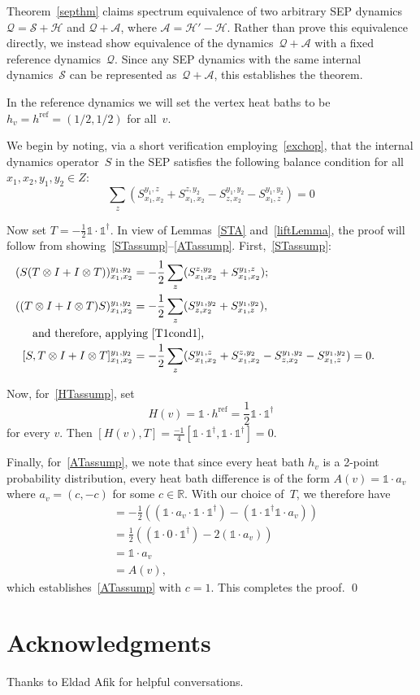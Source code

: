 \documentclass[11pt]{article}
\theoremstyle{plain}
\theoremstyle{definition}
\theoremstyle{remark}
\newcommand{\rset}{\mathbb R}
\numberwithin{equation}{section}
\newcommand{\cA}{{\mathcal A}}
\newcommand{\cH}{{\mathcal H}}
\newcommand{\cS}{{\mathcal S}}
\newcommand{\be}{\begin{equation}}
\newcommand{\ee}{\end{equation}}
\newcommand{\da}{\dagger}
\newcommand{\one}{\mathbb{1}}
\renewcommand{\cS}{{\mathcal Q}}
\newcommand{\cSin}{{\mathcal S}}
\newcommand{\hrf}{h^{\text{ref}}}
\newenvironment{proofof}[1]{{\par\bigskip\noindent \em Proof of #1.}\/}{\hfill\qed\bigskip}
\begin{document}
\begin{proofof}{Theorem~\ref{septhm}}
Theorem~\ref{septhm} claims spectrum equivalence of two arbitrary SEP dynamics
$\cS=\cSin+\cH$ and $\cS+\cA$, where $\cA=\cH'-\cH$.  Rather than prove this equivalence
directly, we instead show equivalence of the dynamics~$\cS+\cA$ with a fixed reference
dynamics~$\cS$.  Since any SEP dynamics with the same internal dynamics~$\cSin$ can be 
represented as~$\cS+\cA$, this establishes the theorem.

In the reference dynamics we will set the vertex heat baths to be $h_v=\hrf=(1/2,1/2)$ for all~$v$.

We begin by noting, via a short verification employing~\eqref{exchop}, that the
internal dynamics operator~$S$ in the SEP
satisfies the following balance condition for all $x_1,x_2,y_1,y_2\in Z$:
\be
\sum_{z} (S_{x_1,x_2}^{y_1,z}+S_{x_1,x_2}^{z,y_2}
-S_{z,x_2}^{y_1,y_2} - S_{x_1,z}^{y_1,y_2})  = 0
\label{T1cond1}
\ee

Now set $T=-\frac{1}{2}\one \cdot \one^\da$. 
In view of Lemmas~\ref{STA} and~\ref{liftLemma}, the proof will follow from showing~\eqref{STassump}--\eqref{ATassump}. 
First,~\eqref{STassump}:
\begin{align*} 
(S(T\otimes I + I \otimes T))_{x_1,x_2}^{y_1,y_2}
&=-\frac{1}{2} \sum_{z} (S_{x_1,x_2}^{z,y_2}+S_{x_1,x_2}^{y_1,z}); \\ 
 ((T\otimes I + I \otimes T)S)_{x_1,x_2}^{y_1,y_2}
 &=-\frac{1}{2}\sum_{z} (S_{z,x_2}^{y_1,y_2} + S_{x_1,z}^{y_1,y_2}), \\ 
 \noalign{and therefore, applying~\eqref{T1cond1},}
 [S,T\otimes I + I \otimes T]_{x_1,x_2}^{y_1,y_2}
 &=-\frac{1}{2} \sum_{z} (S_{x_1,x_2}^{y_1,z}+S_{x_1,x_2}^{z,y_2}
-S_{z,x_2}^{y_1,y_2} - S_{x_1,z}^{y_1,y_2}) =0.
\end{align*}

Now, for~\eqref{HTassump}, set 
\be H(v)=\one \cdot \hrf=\frac12 \one \cdot \one^\da \label{H'ref} \ee
for every $v$. Then $[H(v),T]=\frac{-1}{4}[\one \cdot \one^\da,\one \cdot \one^\da]=0$. 

Finally, for~\eqref{ATassump}, we note that since every heat bath $h_v$ is a 2-point probability distribution, 
every heat bath difference is of the form $A(v)= \one \cdot a_v$ where $a_v=(c,-c)$ for some $c\in\rset$. 
With our choice of~$T$, we therefore have
\begin{align*} [A(v),T]
&=-\frac{1}{2}((\one \cdot a_v \cdot \one \cdot \one^\da) - (\one \cdot \one^\da \one \cdot a_v)) \\
&= \frac{1}{2}((\one \cdot 0 \cdot \one^\da)-2(\one \cdot a_v)) \\
&= \one \cdot a_v \\ &= A(v),
\end{align*}
which establishes~\eqref{ATassump} with $c=1$.  This completes the proof.
\end{proofof}


\section*{Acknowledgments}
Thanks to Eldad Afik for helpful conversations.

%

\end{document}
